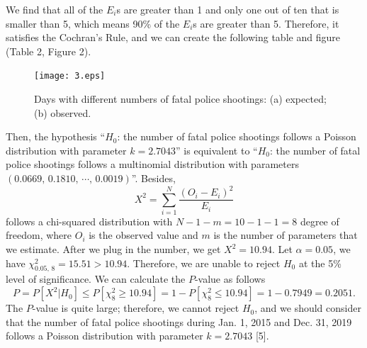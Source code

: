 \documentclass[a4paper]{article}
\begin{document}
	We find that all of the $E_i$s are greater than 1 and only one out of ten that is smaller than 5, which means 90\% of the $E_i$s are greater than 5. Therefore, it satisfies the Cochran's Rule, and we can create the following table and figure (Table 2, Figure 2).

\begin{table}[H]
\centering
{}
\caption{Expected and observed days with different numbers of fatal police shootings.}
\end{table}

\begin{figure}[H]
\centering
\texttt{[image: 3.eps]}
\captionsetup{justification=centering}
\caption{Days with different numbers of fatal police shootings: (a) expected; (b) observed.}
\end{figure}

	Then, the hypothesis “$H_0$: the number of fatal police shootings follows a Poisson distribution with parameter $k=2.7043$” is equivalent to “$H_0$: the number of fatal police shootings follows a multinomial distribution with parameters $(0.0669,\, 0.1810,\,\cdots,\,0.0019)$”. Besides, $$X^2=\sum_{i=1}^N\frac{(O_i-E_i)^2}{E_i}$$ follows a chi-squared distribution with $N-1-m=10-1-1=8$ degree of freedom, where $O_i$ is the observed value and $m$ is the number of parameters that we estimate. After we plug in the number, we get $X^2=10.94$. Let $\alpha=0.05$, we have $\chi_{0.05,\,8}^2=15.51>10.94$. Therefore, we are unable to reject $H_0$ at the 5\% level of significance. We can calculate the $P$-value as follows $$P=P[X^2|H_0]\le P[\chi_8^2\ge10.94]=1-P[\chi_8^2\le10.94]=1-0.7949=0.2051.$$The $P$-value is quite large; therefore, we cannot reject $H_0$, and we should consider that the number of fatal police shootings during Jan. 1, 2015 and Dec. 31, 2019 follows a Poisson distribution with parameter $k=2.7043$ [5].
\end{document}
